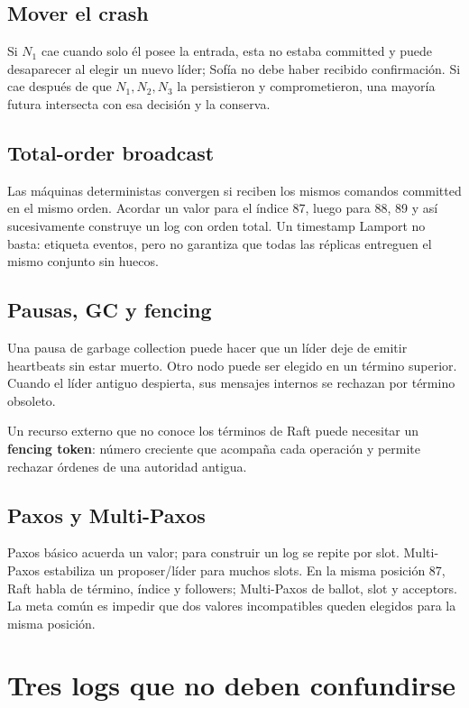 \documentclass[variant=apuntes,cover=institutional,mode=screen]{ua-engineering-v6-article}
\begin{document}
\subsection{Mover el crash}

Si \(N_1\) cae cuando solo él posee la entrada, esta no estaba committed y puede desaparecer al elegir un nuevo líder; Sofía no debe haber recibido confirmación. Si cae después de que \(N_1,N_2,N_3\) la persistieron y comprometieron, una mayoría futura intersecta con esa decisión y la conserva.

\subsection{Total-order broadcast}

Las máquinas deterministas convergen si reciben los mismos comandos committed en el mismo orden. Acordar un valor para el índice 87, luego para 88, 89 y así sucesivamente construye un log con orden total. Un timestamp Lamport no basta: etiqueta eventos, pero no garantiza que todas las réplicas entreguen el mismo conjunto sin huecos.

\subsection{Pausas, GC y fencing}

Una pausa de garbage collection puede hacer que un líder deje de emitir heartbeats sin estar muerto. Otro nodo puede ser elegido en un término superior. Cuando el líder antiguo despierta, sus mensajes internos se rechazan por término obsoleto.

Un recurso externo que no conoce los términos de Raft puede necesitar un \textbf{fencing token}: número creciente que acompaña cada operación y permite rechazar órdenes de una autoridad antigua.

\subsection{Paxos y Multi-Paxos}

Paxos básico acuerda un valor; para construir un log se repite por slot. Multi-Paxos estabiliza un proposer/líder para muchos slots. En la misma posición 87, Raft habla de término, índice y followers; Multi-Paxos de ballot, slot y acceptors. La meta común es impedir que dos valores incompatibles queden elegidos para la misma posición.

\section{Tres logs que no deben confundirse}
\end{document}

